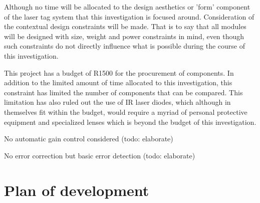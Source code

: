 Although no time will be allocated to the design aesthetics or 'form' component of the laser tag system that this investigation is focused around. Consideration of the contextual design constraints will be made. That is to say that all modules will be designed with size, weight and power constraints in mind, even though such constraints do not directly influence what is possible during the course of this investigation.

This project has a budget of R1500 for the procurement of components. In addition to the limited amount of time allocated to this investigation, this constraint has limited the number of components that can be compared. This limitation has also ruled out the use of IR laser diodes, which although in themselves fit within the budget, would require a myriad of personal protective equipment and specialized lenses which is beyond the budget of this investigation.

No automatic gain control considered (todo: elaborate)

No error correction but basic error detection (todo: elaborate)





\section{Plan of development}

